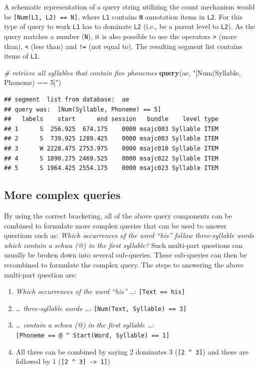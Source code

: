 \documentclass[]{book}
\newenvironment{Shaded}{\begin{snugshade}}{\end{snugshade}}
\newcommand{\CommentTok}[1]{\textcolor[rgb]{0.56,0.35,0.01}{\textit{#1}}}
\newcommand{\KeywordTok}[1]{\textcolor[rgb]{0.13,0.29,0.53}{\textbf{#1}}}
\newcommand{\NormalTok}[1]{#1}
\newcommand{\StringTok}[1]{\textcolor[rgb]{0.31,0.60,0.02}{#1}}
\providecommand{\tightlist}{%
  \setlength{\itemsep}{0pt}\setlength{\parskip}{0pt}}
\begin{document}
A schematic representation of a query string utilizing the count mechanism would be \texttt{{[}Num(L1,\ L2)\ ==\ N{]}}, where \texttt{L1} contains \texttt{N} annotation items in \texttt{L2}. For this type of query to work \texttt{L1} has to dominate \texttt{L2} (i.e., be a parent level to \texttt{L2}). As the query matches a number (\texttt{N}), it is also possible to use the operators \texttt{\textgreater{}} (more than), \texttt{\textless{}} (less than) and \texttt{!=} (not equal to). The resulting segment list contains items of \texttt{L1}.

\begin{Shaded}
\begin{Highlighting}[]
\CommentTok{# retrieve all syllables that contain five phonemes}
\KeywordTok{query}\NormalTok{(ae, }\StringTok{"[Num(Syllable, Phoneme) == 5]"}\NormalTok{)}
\end{Highlighting}
\end{Shaded}

\begin{verbatim}
## segment  list from database:  ae 
## query was:  [Num(Syllable, Phoneme) == 5] 
##   labels    start      end session   bundle    level type
## 1      S  256.925  674.175    0000 msajc003 Syllable ITEM
## 2      S  739.925 1289.425    0000 msajc003 Syllable ITEM
## 3      W 2228.475 2753.975    0000 msajc010 Syllable ITEM
## 4      S 1890.275 2469.525    0000 msajc022 Syllable ITEM
## 5      S 1964.425 2554.175    0000 msajc023 Syllable ITEM
\end{verbatim}

\hypertarget{subsec:query_moreComplexQueries}{%
\subsection{More complex queries}\label{subsec:query_moreComplexQueries}}

By using the correct bracketing, all of the above query components can be combined to formulate more complex queries that can be used to answer questions such as: \emph{Which occurrences of the word ``his'' follow three-syllable words which contain a schwa (@) in the first syllable?} Such multi-part questions can usually be broken down into several sub-queries. These sub-queries can then be recombined to formulate the complex query. The steps to answering the above multi-part question are:

\begin{enumerate}
\def\labelenumi{\arabic{enumi}.}
\tightlist
\item
  \emph{Which occurrences of the word ``his'' \ldots{}}: \texttt{{[}Text\ ==\ his{]}}
\item
  \emph{\ldots{} three-syllable words \ldots{}}: \texttt{{[}Num(Text,\ Syllable)\ ==\ 3{]}}
\item
  \emph{\ldots{} contain a schwa (@) in the first syllable \ldots{}}: \texttt{{[}Phoneme\ ==\ @\ \^{}\ Start(Word,\ Syllable)\ ==\ 1{]}}
\item
  All three can be combined by saying 2 dominates 3 (\texttt{{[}2\ \^{}\ 3{]}}) and these are followed by 1 (\texttt{{[}2\ \^{}\ 3{]}\ -\textgreater{}\ 1{]}})
\end{enumerate}
\end{document}
